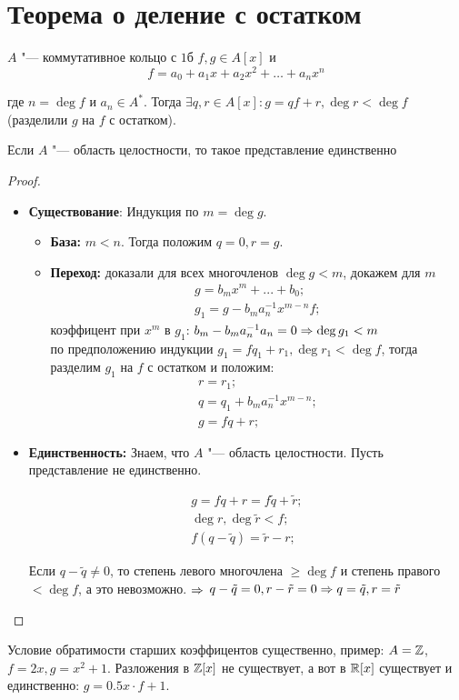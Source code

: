 \section{Теорема о деление с остатком}
\begin{theorem}{}
	$A$ "--- коммутативное кольцо с $1$б
	$f, g \in A[x]$ и
	\[f = a_0 + a_1x + a_2x^2 + \dots + a_nx^n\]
	
	где $n = \deg f$ и $a_n \in A^*$. Тогда $\exists q, r \in A[x] \colon  g = qf + r, \deg r < \deg f$
	(разделили $g$ на $f$ с остатком).
\end{theorem}

\begin{Rem}
	Если $A$ "--- область целостности, то такое представление единственно
\end{Rem}

\begin{proof}
\begin{itemize}
\item \textbf{Существование}:
	Индукция по $m = \deg g$.
	\begin{itemize}
	\item
	\textbf{База:} $m < n$. Тогда положим $q=0, r=g$.
	\item
	\textbf{Переход:} доказали для всех многочленов $\deg g < m$, докажем для $m$
	\begin{gather*}
	g = b_mx^m + ... + b_0; \\
	g_1 = g - b_m a_n^{-1}x^{m-n}f;
	\end{gather*}
	коэффицент при $x^m$ в $g_1$: $b_m - b_m a_n^{-1} a_n = 0 \Rightarrow \deg g_1 < m$\\
	по предположению индукции $g_1 = fq_1 + r_1, \deg r_1	< \deg f $, тогда разделим $g_1$ на $f$ с остатком и положим:
	\begin{gather*}
		r = r_1; \\
		q = q_1 + b_m a_n^{-1} x^{m-n}; \\
		g = fq	+ r;
	\end{gather*}
	\end{itemize}

\item	
	\textbf{Единственность:}
	Знаем, что $A$ "--- область целостности. Пусть представление не единственно.

	\begin{gather*}
	g = fq + r = f \tilde{q} + \tilde{r}; \\
	\deg r, \deg \tilde{r} < f; \\
	f (q - \tilde{q}) = \tilde{r} - r;
	\end{gather*}

	Если $q - \tilde{q} \neq 0$, то степень левого многочлена $\geq \deg f$ и степень правого $< \deg f$, а
	это невозможно. $\Rightarrow$
	$q -\tilde{q} = 0, r - \tilde{r} = 0 \Rightarrow q = \tilde{q}, r = \tilde{r}$
\end{itemize}
\end{proof}

\begin{Rem}
	Условие обратимости старших коэффицентов существенно, пример:
	$A = \mathbb{Z}$, $f = 2x, g = x^2 + 1$. Разложения в $\mathbb{Z}[x]$ не существует, а вот в $\mathbb{R}[x]$ существует
	и единственно: $g=0.5x \cdot f + 1$.
\end{Rem}
